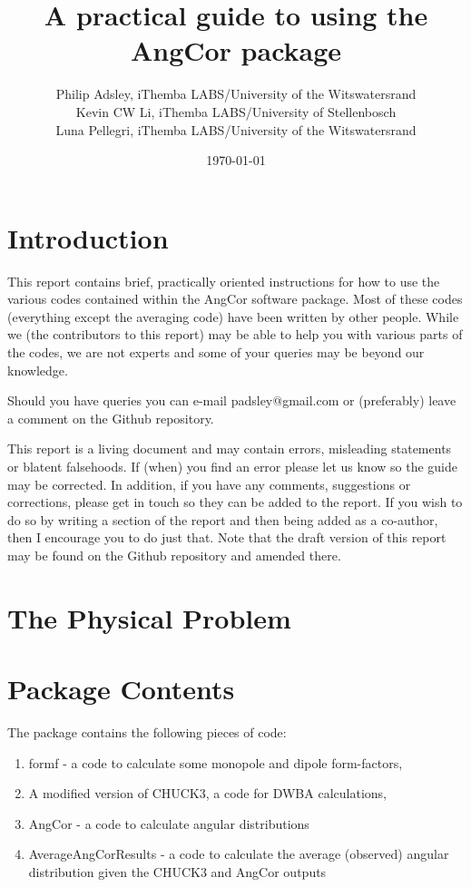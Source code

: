 \documentclass[a4paper,10pt]{article}
\title{A practical guide to using the AngCor package}
\author{Philip Adsley, iThemba LABS/University of the Witswatersrand\\
Kevin CW Li, iThemba LABS/University of Stellenbosch\\
Luna Pellegri, iThemba LABS/University of the Witswatersrand}
\date{\today}
\begin{document}
\maketitle

\section{Introduction}

This report contains brief, practically oriented instructions for how to use the various codes contained within the AngCor software package. Most of these codes (everything except the averaging code) have been written by other people. While we (the contributors to this report) may be able to help you with various parts of the codes, we are not experts and some of your queries may be beyond our knowledge.

Should you have queries you can e-mail padsley@gmail.com or (preferably) leave a comment on the Github repository.

This report is a living document and may contain errors, misleading statements or blatent falsehoods. If (when) you find an error please let us know so the guide may be corrected. In addition, if you have any comments, suggestions or corrections, please get in touch so they can be added to the report. If you wish to do so by writing a section of the report and then being added as a co-author, then I encourage you to do just that. Note that the draft version of this report may be found on the Github repository and amended there.

\section{The Physical Problem}

\section{Package Contents}

The package contains the following pieces of code:

\begin{enumerate}
 \item formf - a code to calculate some monopole and dipole form-factors,
 \item A modified version of CHUCK3, a code for DWBA calculations,
 \item AngCor - a code to calculate angular distributions
 \item AverageAngCorResults - a code to calculate the average (observed) angular distribution given the CHUCK3 and AngCor outputs
\end{enumerate}
\end{document}
